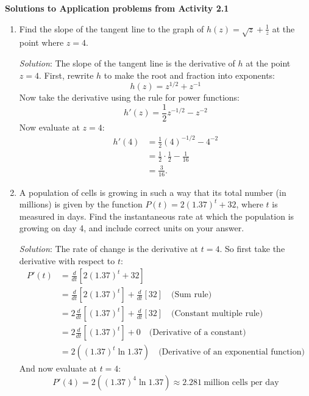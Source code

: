 \documentclass[11pt]{article}
\begin{document}
	
	\thispagestyle{empty}
	\renewcommand{\headrulewidth}{0.0pt}
	\thispagestyle{fancy}
	\lfoot{}
	\cfoot{}
	\rfoot{}	
	
	\vspace*{0in}

\begin{center}
	\textbf{Solutions to Application problems from Activity 2.1}
\end{center}

\begin{enumerate}
	\item Find the slope of the tangent line to the graph of $h(z) = \sqrt{z} + \frac{1}{z}$ at the point where $z = 4$. 
	
\noindent
\emph{Solution}: The slope of the tangent line is the derivative of $h$ at the point $z=4$. First, rewrite $h$ to make the root and fraction into exponents: 
\[ h(z) = z^{1/2} + z^{-1} \]
Now take the derivative using the rule for power functions: 
\[ h'(z) = \frac{1}{2}z^{-1/2} - z^{-2} \]
Now evaluate at $z=4$: 
\begin{align*}
	h'(4) &= \frac{1}{2}(4)^{-1/2} - 4^{-2} \\ 
	&= \frac{1}{2}\cdot \frac{1}{2} - \frac{1}{16} \\
	&= \frac{3}{16}.
\end{align*}
	
		
	\item A population of cells is growing in such a way that its total number (in millions) is given by the function $P(t) = 2(1.37)^t + 32$, where $t$ is measured in days. Find the instantaneous rate at which the population is growing on day 4, and include correct units on your answer. 

	\noindent
	\emph{Solution}: The rate of change is the derivative at $t=4$. So first take the derivative with respect to $t$: 
	\begin{align*}
		P'(t) &= \frac{d}{dt}[2(1.37)^t + 32] \\
		&= \frac{d}{dt}[2 (1.37)^t] + \frac{d}{dt}[32] \quad \text{(Sum rule)} \\
		&= 2 \frac{d}{dt}[(1.37)^t] + \frac{d}{dt}[32] \quad \text{(Constant multiple rule)}\\
		&= 2 \frac{d}{dt}[(1.37)^t] + 0 \quad \text{(Derivative of a constant)}\\
		&= 2 ((1.37)^t \ln 1.37) \quad \text{(Derivative of an exponential function)}
	\end{align*}
And now evaluate at $t=4$: 
\[ P'(4) = 	2 ((1.37)^4 \ln 1.37) \approx 2.281 \ \text{million cells per day}\]
	

\end{enumerate}
\end{document}

